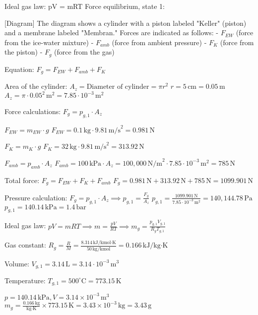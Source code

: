 Ideal gas law: pV = mRT  
Force equilibrium, state 1:  

[Diagram]  
The diagram shows a cylinder with a piston labeled "Keller" (piston) and a membrane labeled "Membran." Forces are indicated as follows:  
- \( F_{EW} \) (force from the ice-water mixture)  
- \( F_{amb} \) (force from ambient pressure)  
- \( F_K \) (force from the piston)  
- \( F_g \) (force from the gas)  

Equation:  
\( F_g = F_{EW} + F_{amb} + F_K \)  

Area of the cylinder:  
\( A_z = \text{Diameter of cylinder} = \pi r^2 \)  
\( r = 5 \, \text{cm} = 0.05 \, \text{m} \)  
\( A_z = \pi \cdot 0.05^2 \, \text{m}^2 = 7.85 \cdot 10^{-3} \, \text{m}^2 \)  

Force calculations:  
\( F_g = p_{g,1} \cdot A_z \)  

\( F_{EW} = m_{EW} \cdot g \)  
\( F_{EW} = 0.1 \, \text{kg} \cdot 9.81 \, \text{m/s}^2 = 0.981 \, \text{N} \)  

\( F_K = m_K \cdot g \)  
\( F_K = 32 \, \text{kg} \cdot 9.81 \, \text{m/s}^2 = 313.92 \, \text{N} \)  

\( F_{amb} = p_{amb} \cdot A_z \)  
\( F_{amb} = 100 \, \text{kPa} \cdot A_z = 100,000 \, \text{N/m}^2 \cdot 7.85 \cdot 10^{-3} \, \text{m}^2 = 785 \, \text{N} \)  

Total force:  
\( F_g = F_{EW} + F_K + F_{amb} \)  
\( F_g = 0.981 \, \text{N} + 313.92 \, \text{N} + 785 \, \text{N} = 1099.901 \, \text{N} \)  

Pressure calculation:  
\( F_g = p_{g,1} \cdot A_z \implies p_{g,1} = \frac{F_g}{A_z} \)  
\( p_{g,1} = \frac{1099.901 \, \text{N}}{7.85 \cdot 10^{-3} \, \text{m}^2} = 140,144.78 \, \text{Pa} \)  
\( p_{g,1} = 140.14 \, \text{kPa} = 1.4 \, \text{bar} \)  

Ideal gas law:  
\( pV = mRT \implies m = \frac{pV}{RT} \implies m_g = \frac{p_{g,1} V_{g,1}}{R_g T_{g,1}} \)  

Gas constant:  
\( R_g = \frac{R}{M} = \frac{8.314 \, \text{kJ/kmol·K}}{50 \, \text{kg/kmol}} = 0.166 \, \text{kJ/kg·K} \)  

Volume:  
\( V_{g,1} = 3.14 \, \text{L} = 3.14 \cdot 10^{-3} \, \text{m}^3 \)  

Temperature:  
\( T_{g,1} = 500^\circ \text{C} = 773.15 \, \text{K} \)

\( p = 140.14 \, \text{kPa}, V = 3.14 \times 10^{-3} \, \text{m}^3 \)  
\( m_g = \frac{0.166 \, \text{kg}}{\text{kg} \cdot \text{K}} \times 773.15 \, \text{K} = 3.43 \times 10^{-3} \, \text{kg} = 3.43 \, \text{g} \)
